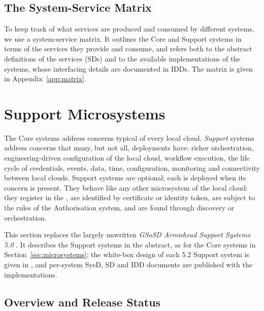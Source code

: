 \documentclass[a4paper]{arrowhead}
\newcommand{\sys}[1]{\textcolor{ArrowheadBlue}{\textbf{\ahbreak{#1}}}}      %
\begin{document}
\subsection{The System-Service Matrix}
\label{sec:matrix}

To keep track of what services are produced and consumed by different systems, we use a
system-service matrix. It outlines the Core and Support systems in terms of the services they
provide and consume, and refers both to the abstract definitions of the services (SDs) and to
the available implementations of the systems, whose interfacing details are documented in IDDs.
The matrix is given in Appendix~\ref{app:matrix}.

\newpage
\section{Support Microsystems}
\label{sec:support}

The Core systems address concerns typical of every local cloud. \emph{Support} systems address
concerns that many, but not all, deployments have: richer orchestration, engineering-driven
configuration of the local cloud, workflow execution, the life cycle of credentials, events, data,
time, configuration, monitoring and connectivity between local clouds. Support systems are
optional; each is deployed when its concern is present. They behave like any other microsystem
of the local cloud: they register in the \sys{ServiceRegistry}, are identified by certificate or
identity token, are subject to the rules of the Authorisation system, and are found through
discovery or orchestration.

This section replaces the largely unwritten \emph{GSoSD Arrowhead Support Systems 5.0}
\cite{gsosdsup50}. It describes the Support systems in the abstract, as for the Core systems in
Section~\ref{sec:microsystems}; the white-box design of each 5.2 Support system is given in
\cite{gsosddsup}, and per-system SysD, SD and IDD documents are published with the
implementations.

\subsection{Overview and Release Status}
\label{sec:sup:overview}
\end{document}
